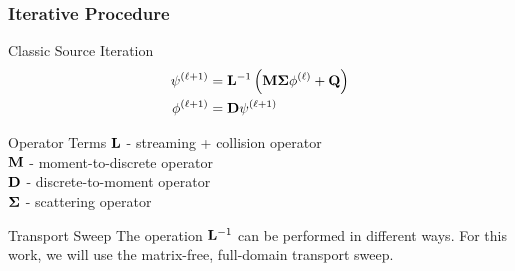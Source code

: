 \documentclass[compress,10pt]{beamer}
\begin{document}
\typeout{***********************************************************************************}
\begin{frame}[t]\frametitle{Iterative Procedure}
\begin{block}{Classic Source Iteration} {\small
\begin{equation*}
\begin{aligned}
 \psi^{(\ell+1)} &= {\bf L}^{-1} \left( {\bf M} {\bf \Sigma} \phi^{(\ell)}  +  {\bf Q} \right) \\
\phi^{(\ell+1)} &= {\bf D}  \psi^{(\ell+1)}
\end{aligned}
\end{equation*}
}\end{block}
\begin{block}{Operator Terms} {\small
${\bf L}$ - streaming + collision operator \\
${\bf M}$ - moment-to-discrete operator \\
${\bf D}$ - discrete-to-moment operator \\
${\bf \Sigma}$ - scattering operator 
}\end{block}
\begin{block}{Transport Sweep} {\small
The operation ${\bf L}^{-1}$ can be performed in different ways. For this work, we will use the matrix-free, full-domain transport sweep.
} \end{block}
\end{frame}
\typeout{***********************************************************************************}
\end{document}
